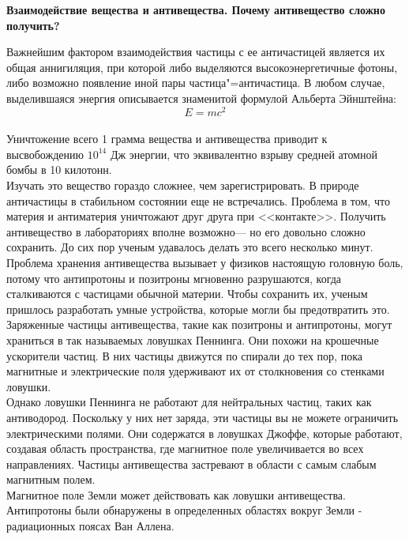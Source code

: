 \begin{flushleft}
\newpage
\textbf{Взаимодействие вещества и антивещества. Почему антивещество сложно получить?}
\vspace*{14pt}

Важнейшим фактором взаимодействия частицы с ее античастицей является их общая аннигиляция, 
при которой либо выделяются высокоэнергетичные фотоны, либо возможно появление иной пары 
частица"=античастица. В любом случае, выделившаяся энергия описывается знаменитой формулой Альберта Эйнштейна:
\begin{equation*}
    E = mc^2
\end{equation*} \\
Уничтожение всего 1 грамма вещества и антивещества приводит к высвобождению $10^{14}$ Дж энергии, что 
 эквивалентно взрыву средней атомной бомбы в 10 килотонн. \\

Изучать это вещество гораздо сложнее, 
чем зарегистрировать. В природе античастицы в стабильном состоянии еще не
встречались. Проблема в том, что материя и антиматерия
уничтожают друг друга при <<контакте>>.
Получить антивещество в лабораториях вполне возможно— но его довольно сложно сохранить. 
До сих пор ученым удавалось делать это всего несколько минут.\\

Проблема хранения антивещества вызывает у физиков настоящую головную боль, потому что антипротоны
и позитроны мгновенно разрушаются, когда сталкиваются с частицами обычной материи.
Чтобы сохранить их, ученым пришлось разработать умные устройства, которые могли бы предотвратить
это. \\

Заряженные частицы антивещества, такие как позитроны и антипротоны, могут храниться в так называемых ловушках Пеннинга.
 Они похожи на крошечные ускорители частиц. В них частицы движутся по спирали до тех пор, пока магнитные и электрические 
поля удерживают их от столкновения со стенками ловушки.\\

Однако ловушки Пеннинга не работают для нейтральных частиц, таких как антиводород. Поскольку у них нет заряда, эти частицы
вы не можете ограничить электрическими полями. Они содержатся в ловушках Джоффе, которые работают, создавая область 
пространства, где магнитное поле увеличивается во всех направлениях. Частицы антивещества застревают в области
с самым слабым магнитным полем.\\

Магнитное поле Земли может действовать как ловушки антивещества. Антипротоны были обнаружены в определенных областях
вокруг Земли - радиационных поясах Ван Аллена.



\end{flushleft}
